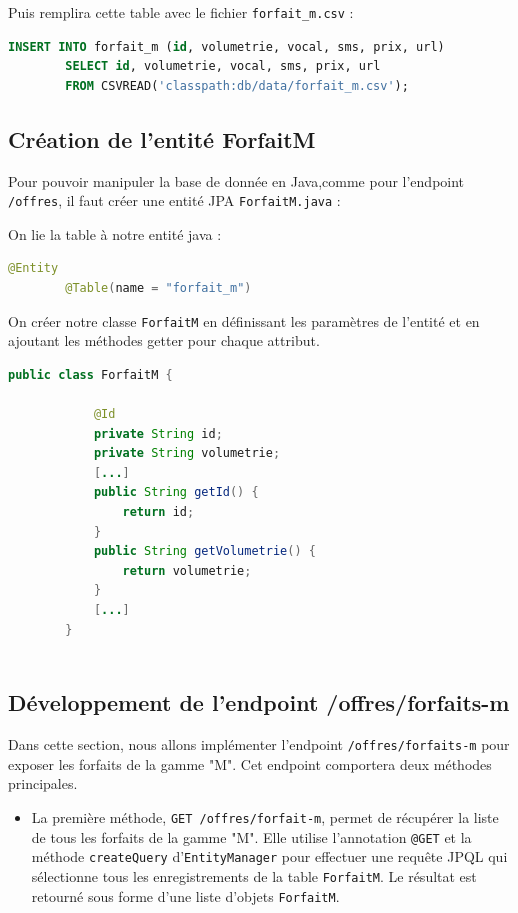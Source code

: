 \documentclass{article}
\begin{document}
	Puis remplira cette table avec le fichier \texttt{forfait\_m.csv} : 
	\begin{lstlisting}[language=SQL] 
		INSERT INTO forfait_m (id, volumetrie, vocal, sms, prix, url)
		SELECT id, volumetrie, vocal, sms, prix, url
		FROM CSVREAD('classpath:db/data/forfait_m.csv');
	\end{lstlisting}
	
	\subsection{Création de l'entité ForfaitM}
	\label{subsec:JPA}
	Pour pouvoir manipuler la base de donnée en Java,comme pour l'endpoint \texttt{/offres}, il faut créer une entité JPA \texttt{ForfaitM.java} :
	
	On lie la table à notre entité java :
	\begin{lstlisting}[language=java]
		@Entity
		@Table(name = "forfait_m") 
	\end{lstlisting}
	
	On créer notre classe \texttt{ForfaitM} en définissant les paramètres de l'entité et en ajoutant les méthodes getter pour chaque attribut.
	\begin{lstlisting}[language=java]
		public class ForfaitM {
			
			@Id
			private String id;
			private String volumetrie;
			[...]
			public String getId() {
				return id;
			}
			public String getVolumetrie() {
				return volumetrie;
			}
			[...]
		}
		
	\end{lstlisting}
		
	\subsection{Développement de l'endpoint /offres/forfaits-m}
	\label{subsec:endpoint-m}
	Dans cette section, nous allons implémenter l'endpoint \texttt{/offres/forfaits-m} pour exposer les forfaits de la gamme "M". Cet endpoint comportera deux méthodes principales.
	
	\begin{itemize}
		\item La première méthode, \texttt{GET /offres/forfait-m}, permet de récupérer la liste de tous les forfaits de la gamme "M". 
		Elle utilise l'annotation \texttt{@GET} et la méthode \texttt{createQuery} d'\texttt{EntityManager} pour effectuer une requête JPQL qui sélectionne tous les enregistrements de la table \texttt{ForfaitM}. 
		Le résultat est retourné sous forme d'une liste d'objets \texttt{ForfaitM}.
	\end{itemize}
	
\end{document}
